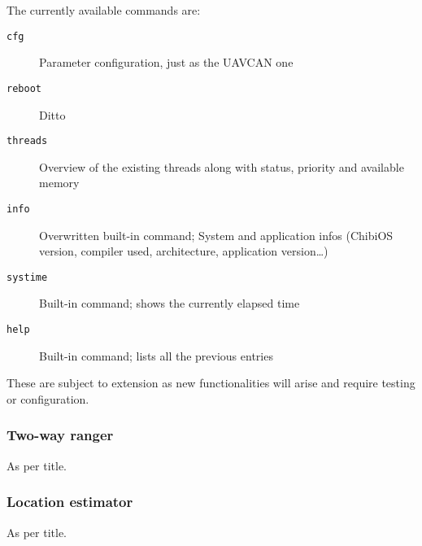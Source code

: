 The currently available commands are:
\begin{description}
    \item[\texttt{cfg}] Parameter configuration, just as the UAVCAN one
    \item[\texttt{reboot}] Ditto
    \item[\texttt{threads}] Overview of the existing threads along with status, priority and available memory
    \item[\texttt{info}] Overwritten built-in command; System and application infos (ChibiOS version, compiler used, architecture, application version\dots)
    \item[\texttt{systime}] Built-in command; shows the currently elapsed time
    \item[\texttt{help}] Built-in command; lists all the previous entries
\end{description}

These are subject to extension as new functionalities will arise and require testing or configuration.


\subsubsection{Two-way ranger}
As per title.


\subsubsection{Location estimator}
As per title.

